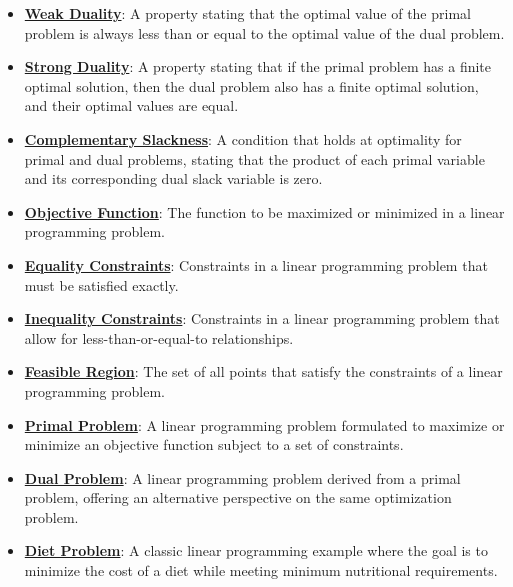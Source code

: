 \documentclass{article}%
\begin{document}
\begin{itemize}[leftmargin=*]
\item \href{https://www.math.purdue.edu/~yipn/421/2024-09-17-DualityGeneral.pdf#page=5}{\textbf{Weak Duality}}: A property stating that the optimal value of the primal problem is always less than or equal to the optimal value of the dual problem.%
\item \href{https://www.math.purdue.edu/~yipn/421/2024-09-17-DualityGeneral.pdf#page=17}{\textbf{Strong Duality}}: A property stating that if the primal problem has a finite optimal solution, then the dual problem also has a finite optimal solution, and their optimal values are equal.%
\item \href{https://www.math.purdue.edu/~yipn/421/2024-09-17-DualityGeneral.pdf#page=22}{\textbf{Complementary Slackness}}: A condition that holds at optimality for primal and dual problems, stating that the product of each primal variable and its corresponding dual slack variable is zero.%
\item \href{https://www.math.purdue.edu/~yipn/421/2024-09-17-DualityGeneral.pdf#page=1}{\textbf{Objective Function}}: The function to be maximized or minimized in a linear programming problem.%
\item \href{https://www.math.purdue.edu/~yipn/421/2024-09-17-DualityGeneral.pdf#page=2}{\textbf{Equality Constraints}}: Constraints in a linear programming problem that must be satisfied exactly.%
\item \href{https://www.math.purdue.edu/~yipn/421/2024-09-17-DualityGeneral.pdf#page=7}{\textbf{Inequality Constraints}}: Constraints in a linear programming problem that allow for less-than-or-equal-to relationships.%
\item \href{https://www.math.purdue.edu/~yipn/421/2024-09-17-DualityGeneral.pdf#page=11}{\textbf{Feasible Region}}: The set of all points that satisfy the constraints of a linear programming problem.%
\item \href{https://www.math.purdue.edu/~yipn/421/2024-09-19-DualityExamples.pdf#page=1}{\textbf{Primal Problem}}: A linear programming problem formulated to maximize or minimize an objective function subject to a set of constraints.%
\item \href{https://www.math.purdue.edu/~yipn/421/2024-09-19-DualityExamples.pdf#page=1}{\textbf{Dual Problem}}: A linear programming problem derived from a primal problem, offering an alternative perspective on the same optimization problem.%
\item \href{https://www.math.purdue.edu/~yipn/421/2024-09-19-DualityExamples.pdf#page=2}{\textbf{Diet Problem}}: A classic linear programming example where the goal is to minimize the cost of a diet while meeting minimum nutritional requirements.%

\end{itemize}
\end{document}

